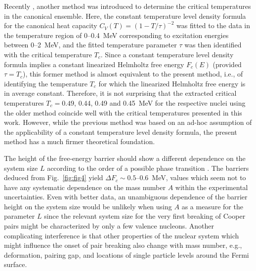 \begin{multicols}{2}
Recently \cite{SB01}, another method was introduced to determine the critical 
temperatures in the canonical ensemble. Here, the constant temperature level
density formula for the canonical heat capacity $C_V(T)=(1-T/\tau)^{-2}$ was 
fitted to the data in the temperature region of 0--0.4~MeV corresponding to 
excitation energies between 0--2~MeV\@, and the fitted temperature parameter 
$\tau$ was then identified with the critical temperature $T_c$. Since a 
constant temperature level density formula implies a constant linearized 
Helmholtz free energy $F_c(E)$ (provided $\tau=T_c$), this former method is 
almost equivalent to the present method, i.e., of identifying the temperature 
$T_c$ for which the linearized Helmholtz free energy is in average constant. 
Therefore, it is not surprising that the extracted critical temperatures 
$T_c=0.49$, 0.44, 0.49 and 0.45~MeV for the respective nuclei using the older
method \cite{SB01,MG01,SG02} coincide well with the critical temperatures 
presented in this work. However, while the previous method was based on an 
ad-hoc assumption of the applicability of a constant temperature level density 
formula, the present method has a much firmer theoretical foundation.

The height of the free-energy barrier should show a different dependence on the
system size $L$ according to the order of a possible phase transition 
\cite{LK90,LK91}. The barriers deduced from Fig.\ \ref{fig:fig4} yield 
$\Delta F_c\sim 0.5$--0.6~MeV, values which seem not to have any systematic 
dependence on the mass number $A$ within the experimental uncertainties. Even 
with better data, an unambiguous dependence of the barrier height on the system
size would be unlikely when using $A$ as a measure for the parameter $L$ since 
the relevant system size for the very first breaking of Cooper pairs might be
characterized by only a few valence nucleons. Another complicating interference
is that other properties of the nuclear system which might influence the onset
of pair breaking also change with mass number, e.g., deformation, pairing gap, 
and locations of single particle levels around the Fermi surface.


\end{multicols}
